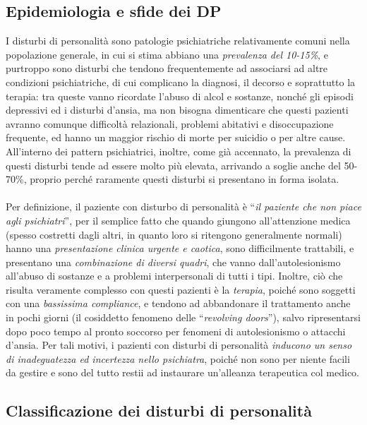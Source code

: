 \subsection{Epidemiologia e sfide dei DP}

I disturbi di personalità sono patologie psichiatriche relativamente
comuni nella popolazione generale, in cui si stima abbiano una
\emph{prevalenza del 10-15\%}, e purtroppo sono disturbi che tendono
frequentemente ad associarsi ad altre condizioni psichiatriche, di cui
complicano la diagnosi, il decorso e soprattutto la terapia: tra queste
vanno ricordate l'abuso di alcol e sostanze, nonché gli episodi
depressivi ed i disturbi d'ansia, ma non bisogna dimenticare che questi
pazienti avranno comunque difficoltà relazionali, problemi abitativi e
disoccupazione frequente, ed hanno un maggior rischio di morte per
suicidio o per altre cause. All'interno dei pattern psichiatrici,
inoltre, come già accennato, la prevalenza di questi disturbi tende ad
essere molto più elevata, arrivando a soglie anche del 50-70\%, proprio
perché raramente questi disturbi si presentano in forma isolata.
\\\\
Per definizione, il paziente con disturbo di personalità è ``\emph{il
paziente che non piace agli psichiatri}'', per il semplice fatto che
quando giungono all'attenzione medica (spesso costretti dagli altri, in
quanto loro si ritengono generalmente normali) hanno una
\emph{presentazione clinica urgente e caotica}, sono difficilmente
trattabili, e presentano una \emph{combinazione di diversi quadri}, che
vanno dall'autolesionismo all'abuso di sostanze e a problemi
interpersonali di tutti i tipi. Inoltre, ciò che risulta veramente
complesso con questi pazienti è la \emph{terapia}, poiché sono soggetti
con una \emph{bassissima compliance}, e tendono ad abbandonare il
trattamento anche in pochi giorni (il cosiddetto fenomeno delle
``\emph{revolving doors}''), salvo ripresentarsi dopo poco tempo al
pronto soccorso per fenomeni di autolesionismo o attacchi d'ansia. Per
tali motivi, i pazienti con disturbi di personalità \emph{inducono un
senso di inadeguatezza ed incertezza nello psichiatra}, poiché non sono
per niente facili da gestire e sono del tutto restii ad instaurare
un'alleanza terapeutica col medico.

\subsection{Classificazione dei disturbi di personalità}

